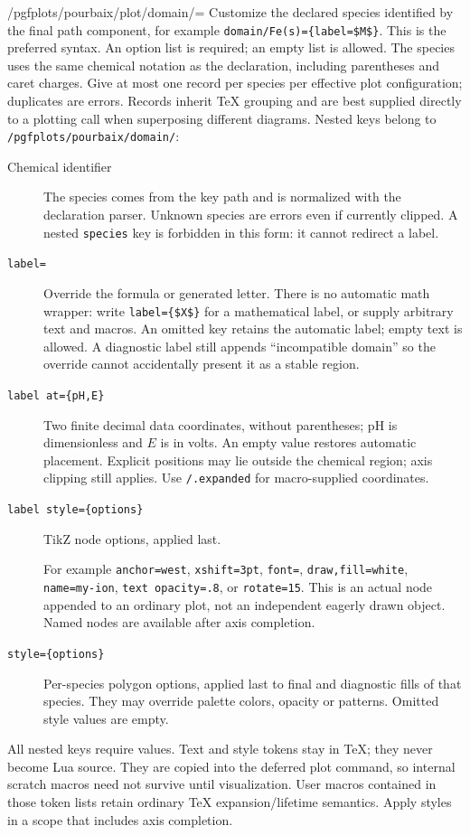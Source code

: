 \documentclass[a4paper,11pt]{ltxdoc}
\begin{document}
\begin{key}{/pgfplots/pourbaix/plot/domain/=}
Customize the declared species identified by the final path component, for example
\texttt{domain/Fe(s)=\{label=\$M\$\}}. This is the preferred syntax.
An option list is required; an empty list is allowed. The species uses the same
chemical notation as the declaration, including parentheses and caret charges.
Give at most one record per species per effective
plot configuration; duplicates are errors. Records inherit TeX grouping and are
best supplied directly to a plotting call when superposing different diagrams.
Nested keys belong to \texttt{/pgfplots/pourbaix/domain/}:
\begin{description}
\item[Chemical identifier] The species comes from the key path and is normalized
with the declaration parser. Unknown species are errors even if currently clipped.
A nested \texttt{species} key is forbidden in this form: it cannot redirect a label.
\item[\texttt{label=}] Override the formula or generated letter.
There is no automatic math wrapper: write \texttt{label=\{\$X\$\}} for a mathematical
label, or supply arbitrary text and macros. An omitted key retains the automatic
label; empty text is allowed. A diagnostic label still appends ``incompatible
domain'' so the override cannot accidentally present it as a stable region.
\item[\texttt{label at=\{pH,E\}}] Two finite decimal data coordinates, without
parentheses; pH is dimensionless and $E$ is in volts. An empty value restores
automatic placement. Explicit positions may lie outside the chemical region;
axis clipping still applies. Use \texttt{/.expanded} for macro-supplied coordinates.
\item[\texttt{label style=\{options\}}] TikZ node options, applied last.\par
For example \texttt{anchor=west}, \texttt{xshift=3pt}, \texttt{font=\string\small},
\texttt{draw,fill=white}, \texttt{name=my-ion}, \texttt{text opacity=.8}, or
\texttt{rotate=15}. This is an actual node appended to an ordinary plot, not an
independent eagerly drawn object. Named nodes are available after axis completion.
\item[\texttt{style=\{options\}}] Per-species polygon options, applied last to
final and diagnostic fills of that species. They may override palette colors,
opacity or patterns. Omitted style values are empty.
\end{description}
All nested keys require values. Text and style tokens stay in TeX; they never
become Lua source. They are copied into the deferred plot command, so internal
scratch macros need not survive until visualization. User macros contained in
those token lists retain ordinary TeX expansion/lifetime semantics. Apply styles
in a scope that includes axis completion.
\end{key}
\end{document}
